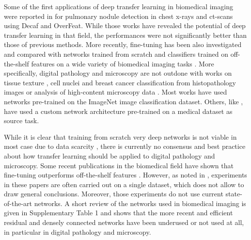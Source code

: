 Some of the first applications of deep transfer learning in biomedical imaging were reported in \parencite{bar2015chest,ciompi2015automatic,van2015off} for pulmonary nodule detection in chest x-rays and \acrshort{ct}-scans using Decaf and OverFeat. While those works have revealed the potential of deep transfer learning in that field, the performances were not significantly better than those of previous methods. More recently, fine-tuning has been also investigated and compared with networks trained from scratch and classifiers trained on off-the-shelf features on a wide variety of biomedical imaging tasks \parencite{antony2016quantifying,esteva2017dermatologist,gulshan2016development, ravishankar2016understanding,shin2016deep,tajbakhsh2016convolutional}. More specifically, digital pathology and microscopy are not outdone with works on tissue texture \parencite{kieffer2017convolutional}, cell nuclei \parencite{bayramoglu2016transfer} and breast cancer \parencite{han2017breast} classification from histopathology images or analysis of high-content microscopy data \parencite{kraus2017automated}. Most works have used networks pre-trained on the ImageNet image classification dataset. Others, like \parencite{kraus2017automated}, have used a custom network architecture pre-trained on a medical dataset as source task. 

While it is clear that training from scratch very deep networks is not viable in most case due to data scarcity \parencite{bayramoglu2016transfer,tajbakhsh2016convolutional}, there is currently no consensus and best practice about how transfer learning should be applied to digital pathology and microscopy. Some recent publications in the biomedical field have shown that fine-tuning outperforms off-the-shelf features \parencite{antony2016quantifying,kieffer2017convolutional,ravishankar2016understanding,shin2016deep}. However, as noted in \parencite{litjens2017survey}, experiments in these papers are often carried out on a single dataset, which does not allow to draw general conclusions. Moreover, those experiments do not use current state-of-the-art networks. A short review of the networks used in biomedical imaging is given in Supplementary Table 1 and shows that the more recent and efficient residual and densely connected networks have been underused or not used at all, in particular in digital pathology and microscopy.



